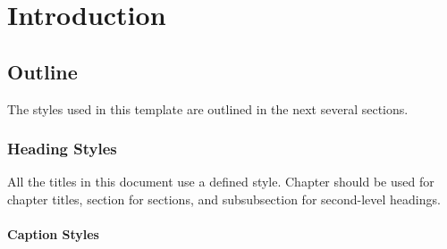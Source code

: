 \chapter{Introduction}


\section{Outline}

The styles used in this template are outlined in the next several sections.

\subsection{Heading Styles}

All the titles in this document use a defined style. Chapter should be used for chapter titles,
section for sections, and subsubsection for second-level headings.

\subsubsection{Caption Styles}
\lipsum
